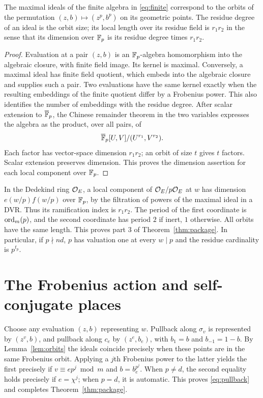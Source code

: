 \documentclass[11pt]{article}
\begin{document}
\begin{lemma}\label{lem:orbits}
The maximal ideals of the finite algebra in \eqref{eq:finite} correspond to the orbits of the permutation $(z,b)\mapsto(z^p,b^p)$ on its geometric points. The residue degree of an ideal is the orbit size; its local length over its residue field is $r_1r_2$ in the sense that its dimension over $\mathbb F_p$ is its residue degree times $r_1r_2$.
\end{lemma}
\begin{proof}
Evaluation at a pair $(z,b)$ is an $\mathbb F_p$-algebra homomorphism into the algebraic closure, with finite field image. Its kernel is maximal. Conversely, a maximal ideal has finite field quotient, which embeds into the algebraic closure and supplies such a pair. Two evaluations have the same kernel exactly when the resulting embeddings of the finite quotient differ by a Frobenius power. This also identifies the number of embeddings with the residue degree. After scalar extension to $\overline{\mathbb F}_p$, the Chinese remainder theorem in the two variables expresses the algebra as the product, over all pairs, of
\[
 \overline{\mathbb F}_p[U,V]/(U^{r_1},V^{r_2}).
\]
Each factor has vector-space dimension $r_1r_2$; an orbit of size $t$ gives $t$ factors. Scalar extension preserves dimension. This proves the dimension assertion for each local component over $\mathbb F_p$.
\end{proof}

In the Dedekind ring $\mathcal O_E$, a local component of $\mathcal O_E/p\mathcal O_E$ at $w$ has dimension $e(w/p)f(w/p)$ over $\mathbb F_p$, by the filtration of powers of the maximal ideal in a DVR. Thus its ramification index is $r_1r_2$. The period of the first coordinate is $\operatorname{ord}_m(p)$, and the second coordinate has period $2$ if inert, $1$ otherwise. All orbits have the same length. This proves part 3 of Theorem~\ref{thm:package}. In particular, if $p\nmid nd$, $p$ has valuation one at every $w\mid p$ and the residue cardinality is $p^{t_p}$.

\section{The Frobenius action and self-conjugate places}
Choose any evaluation $(z,b)$ representing $w$. Pullback along $\sigma_v$ is represented by $(z^v,b)$, and pullback along $c_e$ by $(z^e,b_e)$, with $b_1=b$ and $b_{-1}=1-b$. By Lemma~\ref{lem:orbits} the ideals coincide precisely when these points are in the same Frobenius orbit. Applying a $j$th Frobenius power to the latter yields the first precisely if $v\equiv ep^j\bmod m$ and $b=b_e^{p^j}$. When $p\ne d$, the second equality holds precisely if $e=\chi^j$; when $p=d$, it is automatic. This proves \eqref{eq:pullback} and completes Theorem~\ref{thm:package}.
\end{document}
